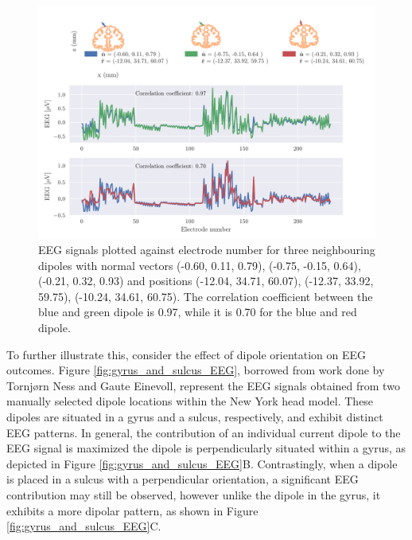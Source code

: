 \documentclass[a4paper, UKenglish, 11pt]{uiomaster}
\begin{document}
\begin{figure}[!htb]
    \centering
    \includegraphics[width=\linewidth]{figures/compare_dipoles.pdf}
    \caption{EEG signals plotted against electrode number for three neighbouring dipoles with normal vectors (-0.60, 0.11, 0.79), (-0.75, -0.15, 0.64), (-0.21, 0.32, 0.93) and positions (-12.04, 34.71, 60.07), (-12.37, 33.92, 59.75), (-10.24, 34.61, 60.75). The correlation coefficient between the blue and green dipole is 0.97, while it is 0.70 for the blue and red dipole.}
    \label{fig:neighbour_dipoles}
\end{figure}

To further illustrate this, consider the effect of dipole orientation on EEG outcomes. Figure \ref{fig:gyrus_and_sulcus_EEG}, borrowed from work done by Tornjørn Ness and Gaute Einevoll, represent the EEG signals obtained from two manually selected dipole locations within the New York head model. These dipoles are situated in a gyrus and a sulcus, respectively, and exhibit distinct EEG patterns. In general, the contribution of an individual current dipole to the EEG signal is maximized the dipole is perpendicularly situated within a gyrus, as depicted in Figure \ref{fig:gyrus_and_sulcus_EEG}B. Contrastingly, when a dipole is placed in a sulcus with a perpendicular orientation, a significant EEG contribution may still be observed, however unlike the dipole in the gyrus, it exhibits a more dipolar pattern, as shown in Figure \ref{fig:gyrus_and_sulcus_EEG}C.
\end{document}

